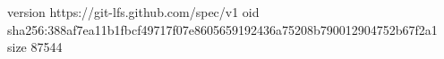 version https://git-lfs.github.com/spec/v1
oid sha256:388af7ea11b1fbcf49717f07e8605659192436a75208b790012904752b67f2a1
size 87544
